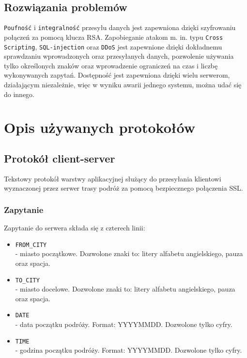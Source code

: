 \documentclass[pdftex,13pt,a4paper]{article}
\begin{document}
\subsection{Rozwiązania problemów}

\texttt{Poufność} i \texttt{integralność} przesyłu danych jest zapewniona dzięki szyfrowaniu połączeń za pomocą klucza RSA. Zapobieganie atakom m. in. typu \texttt{Cross Scripting}, \texttt{SQL-injection} oraz \texttt{DDoS} jest zapewnione dzięki dokładnemu sprawdzaniu wprowadzonych oraz przesyłanych danych, pozwolenie używania tylko określonych znaków oraz wprowadzenie ograniczeń na czas i liczbę wykonywanych zapytań.
\newline
Dostępność jest zapewniona dzięki wielu serwerom, działającym niezależnie, więc w wyniku awarii jednego systemu, można udać się do innego.

\section{Opis używanych protokołów}

\subsection{Protokół client-server}

Tekstowy protokół warstwy aplikacyjnej służący do przesyłania klientowi wyznaczonej przez serwer trasy podróż za pomocą bezpiecznego połączenia SSL.

\subsubsection{Zapytanie}
Zapytanie do serwera składa się z czterech linii:


\begin{itemize}

\item \texttt{FROM\_CITY}\\
- miasto początkowe. Dozwolone znaki to: litery alfabetu angielskiego, pauza oraz spacja.

\item \texttt{TO\_CITY}\\
- miasto docelowe. Dozwolone znaki to: litery alfabetu angielskiego, pauza oraz spacja.

\item \texttt{DATE}\\
- data początku podróży. Format: YYYYMMDD. Dozwolone tylko cyfry.

\item \texttt{TIME}\\
- godzina początku podróży. Format: YYYYMMDD. Dozwolone tylko cyfry.

\end{itemize}
\end{document}
